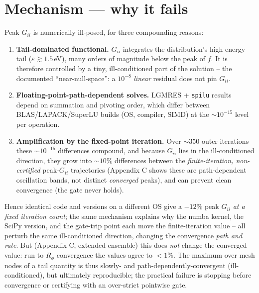 \documentclass[11pt]{article}
\begin{document}
\section{Mechanism --- why it fails}
Peak $G_{ii}$ is numerically ill-posed, for three compounding reasons:
\begin{enumerate}[nosep]
\item \textbf{Tail-dominated functional.} $G_{ii}$ integrates the distribution's high-energy tail ($\varepsilon\gtrsim1.5$\,eV), many orders of magnitude below the peak of $f$. It is therefore controlled by a tiny, ill-conditioned part of the solution -- the documented ``near-null-space'': a $10^{-8}$ \emph{linear} residual does not pin $G_{ii}$.
\item \textbf{Floating-point-path-dependent solves.} LGMRES + \texttt{spilu} results depend on summation and pivoting order, which differ between BLAS/LAPACK/SuperLU builds (OS, compiler, SIMD) at the $\sim10^{-15}$ level per operation.
\item \textbf{Amplification by the fixed-point iteration.} Over $\sim\!350$ outer iterations these $\sim10^{-15}$ differences compound, and because $G_{ii}$ lies in the ill-conditioned direction, they grow into $\sim10\%$ differences between the \emph{finite-iteration, non-certified} peak-$G_{ii}$ trajectories (Appendix C shows these are path-dependent oscillation bands, not distinct \emph{converged} peaks), and can prevent clean convergence (the gate never holds).
\end{enumerate}
Hence identical code and versions on a different OS give a $-12\%$ peak $G_{ii}$ \emph{at a fixed iteration count}; the same mechanism explains why the numba kernel, the SciPy version, and the gate-trip point each move the finite-iteration value -- all perturb the same ill-conditioned direction, changing the convergence \emph{path and rate}. But (Appendix C, extended ensemble) this does \emph{not} change the converged value: run to $R_\phi$ convergence the values agree to $<1\%$. The maximum over mesh nodes of a tail quantity is thus slowly- and path-dependently-convergent (ill-conditioned), but ultimately reproducible; the practical failure is stopping before convergence or certifying with an over-strict pointwise gate.
\end{document}

